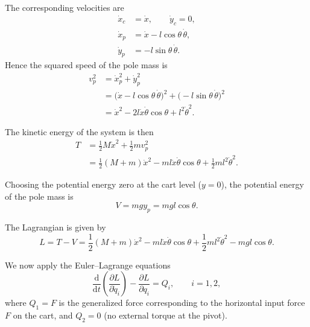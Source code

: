 \documentclass{article}
\begin{document}
The corresponding velocities are
\begin{align}
\dot x_c &= \dot x, \qquad \dot y_c = 0,\\
\dot x_p &= \dot x - l\cos\theta\,\dot\theta,\\
\dot y_p &= -l\sin\theta\,\dot\theta .
\end{align}
Hence the squared speed of the pole mass is
\begin{align}
v_p^2
  &= \dot x_p^2 + \dot y_p^2 \nonumber\\
  &= \bigl(\dot x - l\cos\theta\,\dot\theta\bigr)^2
     + \bigl(-l\sin\theta\,\dot\theta\bigr)^2 \nonumber\\
  &= \dot x^2 - 2 l\dot x\dot\theta\cos\theta + l^2\dot\theta^2.
\end{align}

The kinetic energy of the system is then
\begin{align}
T
  &= \tfrac12 M\dot x^2 + \tfrac12 m v_p^2 \nonumber\\
  &= \frac12 (M+m)\dot x^2
     - m l\dot x\dot\theta\cos\theta
     + \frac12 m l^2\dot\theta^2.
\end{align}

Choosing the potential energy zero at the cart level ($y=0$), the potential energy of the pole mass is
\begin{equation}
V = m g y_p = m g l\cos\theta .
\end{equation}

The Lagrangian is given by
\begin{equation}
L = T - V
  = \frac12 (M+m)\dot x^2
    - m l\dot x\dot\theta\cos\theta
    + \frac12 m l^2\dot\theta^2
    - m g l\cos\theta .
\end{equation}

We now apply the Euler--Lagrange equations
\begin{equation}
\frac{\mathrm{d}}{\mathrm{d}t}\left(\frac{\partial L}{\partial \dot q_i}\right)
 - \frac{\partial L}{\partial q_i}
 = Q_i, \qquad i=1,2,
\end{equation}
where $Q_1 = F$ is the generalized force corresponding to the horizontal input force $F$ on the cart, and $Q_2 = 0$ (no external torque at the pivot).
\end{document}
